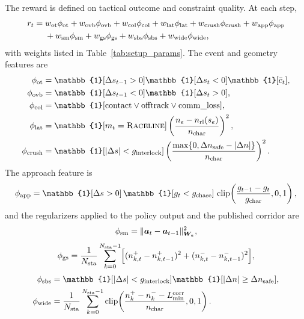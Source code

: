 \documentclass{iopjournal}
\begin{document}
The reward is defined on tactical outcome and constraint quality.  At each
step,
\begin{equation}
\begin{aligned}
r_t={}&
w_{\rm ot}\phi_{\rm ot}
+w_{\rm ovb}\phi_{\rm ovb}
+w_{\rm col}\phi_{\rm col}
+w_{\rm lat}\phi_{\rm lat}
+w_{\rm crush}\phi_{\rm crush}
+w_{\rm app}\phi_{\rm app}\\
&+
w_{\rm sm}\phi_{\rm sm}
+w_{\rm gs}\phi_{\rm gs}
+w_{\rm sbs}\phi_{\rm sbs}
+w_{\rm wide}\phi_{\rm wide},
\end{aligned}
\label{eq:reward_sum}
\end{equation}
with weights listed in Table~\ref{tab:setup_params}.  The event and geometry
features are
\begin{align}
\phi_{\rm ot}
&=\mathbb{1}[\Delta s_{t-1}>0]\mathbb{1}[\Delta s_t<0]\mathbb{1}[\bar c_t],
\label{eq:reward_pass}\\
\phi_{\rm ovb}
&=\mathbb{1}[\Delta s_{t-1}<0]\mathbb{1}[\Delta s_t>0],
\label{eq:reward_overtaken}\\
\phi_{\rm col}
&=\mathbb{1}[{\rm contact}\vee{\rm offtrack}\vee{\rm comm\_loss}],
\label{eq:reward_collision}\\
\phi_{\rm lat}
&=\mathbb{1}[m_t=\textsc{Raceline}]
\left(\frac{n_e-n_{\rm rl}(s_e)}{n_{\rm char}}\right)^2,
\label{eq:reward_lateral}\\
\phi_{\rm crush}
&=\mathbb{1}[|\Delta s|<g_{\rm interlock}]
\left(\frac{\max\{0,\Delta n_{\rm safe}-|\Delta n|\}}{n_{\rm char}}\right)^2 .
\label{eq:reward_crush}
\end{align}
The approach feature is
\begin{equation}
\phi_{\rm app}=
\mathbb{1}[\Delta s>0]\,
\mathbb{1}[g_t<g_{\rm chase}]\,
\operatorname{clip}\!\left(\frac{g_{t-1}-g_t}{g_{\rm char}},0,1\right),
\label{eq:approach_reward}
\end{equation}
and the regularizers applied to the policy output and the published corridor
are
\begin{equation}
\phi_{\rm sm}=
\|\bm{a}_t-\bm{a}_{t-1}\|_{\bm{W}_a}^2,
\label{eq:action_smooth_reward}
\end{equation}
\begin{equation}
\phi_{\rm gs}=
\frac{1}{N_{\rm sta}}\sum_{k=0}^{N_{\rm sta}-1}
\Bigl[
(n_{k,t}^+-n_{k,t-1}^+)^2+
(n_{k,t}^--n_{k,t-1}^-)^2
\Bigr],
\label{eq:corridor_smooth_reward}
\end{equation}
\begin{align}
\phi_{\rm sbs}
&=\mathbb{1}[|\Delta s|<g_{\rm interlock}]
\mathbb{1}[|\Delta n|\ge\Delta n_{\rm safe}],
\label{eq:reward_sbs}\\
\phi_{\rm wide}
&=\frac{1}{N_{\rm sta}}\sum_{k=0}^{N_{\rm sta}-1}
\operatorname{clip}\!\left(
\frac{n_k^+-n_k^- -L_{\min}^{\rm corr}}{n_{\rm char}},0,1
\right).
\label{eq:reward_wide}
\end{align}
\end{document}
